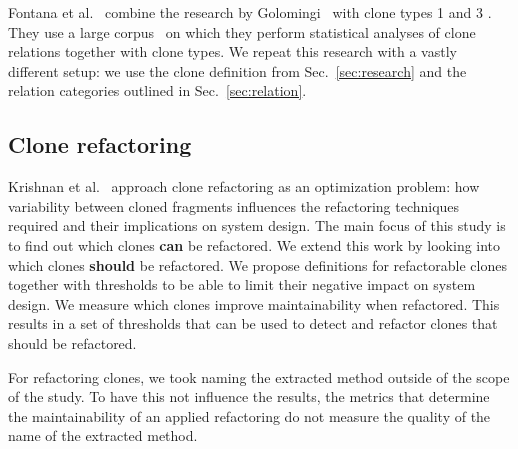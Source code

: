 \documentclass[sigconf,review,anonymous]{acmart}
\begin{document}
Fontana et al.~\cite{fontana2012duplicated, fontana2015duplicated} combine the research by Golomingi~\cite{koni2001scenario} with clone types 1 and 3 \cite{roy2007survey}. They use a large corpus~\cite{tempero2010qualitas} on which they perform statistical analyses of clone relations together with clone types. We repeat this research with a vastly different setup: we use the clone definition from Sec.~\ref{sec:research} and the relation categories outlined in Sec.~\ref{sec:relation}.

\subsection{Clone refactoring}
Krishnan et al.~\cite{krishnan2013refactoring} approach clone refactoring as an optimization problem: how variability between cloned fragments influences the refactoring techniques required and their implications on system design. The main focus of this study is to find out which clones \textbf{can} be refactored. We extend this work by looking into which clones \textbf{should} be refactored. We propose definitions for refactorable clones together with thresholds to be able to limit their negative impact on system design. We measure which clones improve maintainability when refactored. This results in a set of thresholds that can be used to detect and refactor clones that should be refactored.

For refactoring clones, we took naming the extracted method outside of the scope of the study. To have this not influence the results, the metrics that determine the maintainability of an applied refactoring do not measure the quality of the name of the extracted method. 
\end{document}
